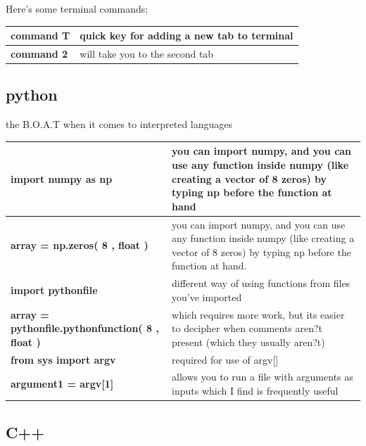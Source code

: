 \documentclass{article}
\begin{document}
Here's some terminal commands;

\begin{center}
\begin{tabular*}{\textwidth}{ | p{} | p{}| }
\hline
\textbf{command T} & quick key for adding a new tab to terminal \\
\hline
\textbf{command 2} & will take you to the second tab \\
\hline
\end{tabular*}
\end{center}






\subsection{python}

the B.O.A.T when it comes to interpreted languages 

\begin{center}
\begin{tabular*}{\textwidth}{ | p{} | p{}| }
\hline
\textbf{import numpy as np} & you can import numpy, and you can use any function inside numpy (like creating a vector of 8 zeros) by typing np before the function at hand \\ 
\hline 
\textbf{array = np.zeros( 8 , float )} & you can import numpy, and you can use any function inside numpy (like creating a vector of 8 zeros) by typing np before the function at hand. \\ 
\hline
\textbf{import pythonfile} & different way of using functions from files you've imported \\
\hline 
\textbf{array = pythonfile.pythonfunction( 8 , float )} & which requires more work, but its easier to decipher when comments aren?t present (which they usually aren?t) \\ 
\hline 
\textbf{from sys import argv} & required for use of argv[]\\
\hline 
\textbf{argument1 = argv[1]} & allows you to run a file with arguments as inputs which I find is frequently useful \\
\hline
\end{tabular*}
\end{center}

\subsection{C++} 
\end{document}
